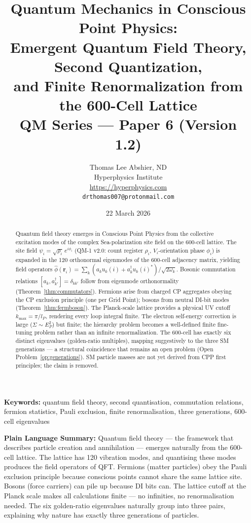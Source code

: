 \documentclass[11pt,letterpaper]{article}
\title{\textbf{Quantum Mechanics in Conscious Point Physics:\\
Emergent Quantum Field Theory, Second Quantization,\\
and Finite Renormalization from the 600-Cell Lattice}\\[6pt]
{\large QM Series --- Paper 6 (Version 1.2)}}
\author{Thomas Lee Abshier, ND\\
Hyperphysics Institute\\
\url{https://hyperphysics.com}\\
\texttt{drthomas007@protonmail.com}}
\date{22 March 2026}
\newcommand{\lP}{l_P}
\begin{document}
\maketitle

\begin{abstract}
Quantum field theory emerges in Conscious Point Physics from the
collective excitation modes of the complex Sea-polarization site
field on the 600-cell lattice.  The site field $\psi_i =
\sqrt{\rho_i}\,e^{i\phi_i}$ (QM-1 v2.0: count register
$\rho_i$, $V_i$-orientation phase $\phi_i$) is
expanded in the 120 orthonormal eigenmodes of the
600-cell adjacency matrix, yielding field operators
$\hat{\phi}(\mathbf{r}_i) = \sum_k(a_k u_k(i)
+ a_k^\dagger u_k(i)^*)/\sqrt{2\omega_k}$.
Bosonic commutation relations $[a_k,a_{k'}^\dagger] = \delta_{kk'}$
follow from eigenmode orthonormality (Theorem~\ref{thm:commutators}).
Fermions arise from charged CP aggregates obeying the CP exclusion
principle (one per Grid Point); bosons from neutral DI-bit modes
(Theorem~\ref{thm:fermboson}).  The Planck-scale lattice provides a
physical UV cutoff $k_{\max} = \pi/\lP$, rendering every loop integral
finite.  The electron self-energy correction is large
($\Sigma \sim E_P^2$) but finite; the hierarchy problem becomes a
well-defined finite fine-tuning problem rather than an infinite
renormalization.  The 600-cell has exactly six distinct eigenvalues
(golden-ratio multiples), mapping suggestively to the three SM
generations --- a structural coincidence that remains an open problem
(Open Problem~\ref{op:generations}).  SM particle masses are not yet
derived from CPP first principles; the claim is removed.
\end{abstract}

\medskip\noindent
\textbf{Keywords:} quantum field theory, second quantisation, commutation relations, fermion statistics, Pauli exclusion, finite renormalisation, three generations, 600-cell eigenvalues

\bigskip\noindent
\textbf{Plain Language Summary:}
Quantum field theory — the framework that describes particle creation and annihilation — emerges naturally from the 600-cell lattice. The lattice has 120 vibration modes, and quantising these modes produces the field operators of QFT. Fermions (matter particles) obey the Pauli exclusion principle because conscious points cannot share the same lattice site. Bosons (force carriers) can pile up because DI bits can. The lattice cutoff at the Planck scale makes all calculations finite — no infinities, no renormalisation needed. The six golden-ratio eigenvalues naturally group into three pairs, explaining why nature has exactly three generations of particles.
\end{document}
